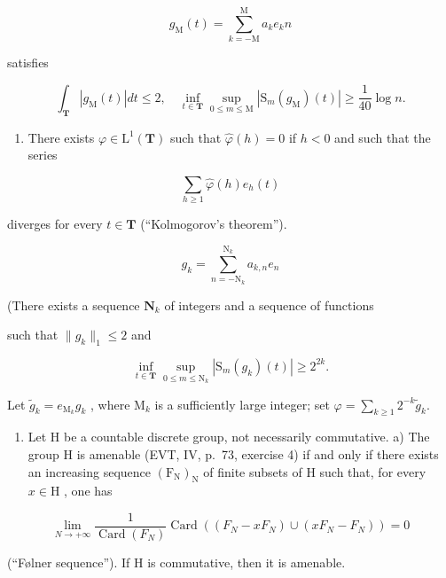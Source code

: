 \[
g _ {\mathrm{M}} (t) = \sum_ {k = - \mathrm{M}} ^ {\mathrm{M}} a _ {k} e _ {k} n
\]

satisfies

\[
\int_ {\mathbf {T}} | g _ {\mathrm{M}} (t) | d t \leqslant 2, \quad \inf _ {t \in \mathbf {T}} \sup _ {0 \leqslant m \leqslant \mathrm{M}} | \mathrm{S} _ {m} (g _ {\mathrm{M}}) (t) | \geqslant \frac {1}{4 0} \log n.
\]

\begin{enumerate}
\def\labelenumi{\alph{enumi})}
\setcounter{enumi}{9}
\tightlist
\item
  There exists \(\varphi\in\mathrm{L}^{1}(\mathbf{T})\) such that \(\widehat{\varphi}(h)=0\) if \(h<0\) and such that the series
\end{enumerate}

\[
\sum_ {h \geqslant 1} \widehat {\varphi} (h) e _ {h} (t)
\]

diverges for every \(t \in \mathbf{T}\) (“Kolmogorov’s theorem”).

\[
g _ {k} = \sum_ {n = - \mathrm{N} _ {k}} ^ {\mathrm{N} _ {k}} a _ {k, n} e _ {n}
\]

(There exists a sequence \(\mathbf{N}_k\) of integers and a sequence of functions

such that \(\| g_k\| _1\leqslant 2\) and

\[
\inf _ {t \in \mathbf {T}} \sup _ {0 \leqslant m \leqslant \mathrm{N} _ {k}} | \mathrm{S} _ {m} (g _ {k}) (t) | \geqslant 2 ^ {2 k}.
\]

Let \(\widetilde{g}_k = e_{\mathrm{M}_k}g_k\) , where \(\mathrm{M}_k\) is a sufficiently large integer; set \(\varphi = \sum_{k\geqslant 1}2^{-k}\widetilde{g}_k.\)

\begin{enumerate}
\def\labelenumi{\arabic{enumi})}
\setcounter{enumi}{51}
\tightlist
\item
  Let H be a countable discrete group, not necessarily commutative. a) The group H is amenable (EVT, IV, p.~73, exercise 4) if and only if there exists an increasing sequence \((\mathrm{F_N})_{\mathrm{N}}\) of finite subsets of H such that, for every \(x \in \mathrm{H}\) , one has
\end{enumerate}

\[
\lim _ {N \to + \infty} \frac {1}{\operatorname{Card} (F _ {N})} \operatorname{Card} ((F _ {N} - x F _ {N}) \cup (x F _ {N} - F _ {N})) = 0
\]

(“Følner sequence”). If H is commutative, then it is amenable.

